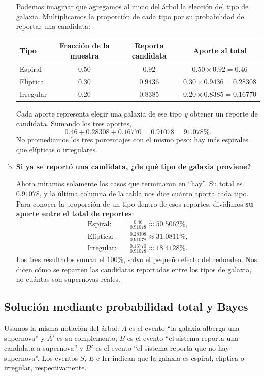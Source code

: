 \documentclass[a4paper]{article}
\begin{document}
\begin{enumerate}[a)]
Podemos imaginar que agregamos al inicio del árbol la elección del tipo de galaxia. Multiplicamos la proporción de cada tipo por su probabilidad de reportar una candidata:
\begin{center}
\begin{tabular}{lccc}
\toprule
Tipo & Fracción de la muestra & Reporta candidata & Aporte al total \\
\midrule
Espiral & $0.50$ & $0.92$ & $0.50\times0.92=0.46$ \\
Elíptica & $0.30$ & $0.9436$ & $0.30\times0.9436=0.28308$ \\
Irregular & $0.20$ & $0.8385$ & $0.20\times0.8385=0.16770$ \\
\bottomrule
\end{tabular}
\end{center}
Cada aporte representa elegir una galaxia de ese tipo \textit{y} obtener un reporte de candidata. Sumando los tres aportes,
$$
0.46+0.28308+0.16770=\boxed{0.91078=91.078\%}.
$$
No promediamos los tres porcentajes con el mismo peso: hay más espirales que elípticas o irregulares.

\item \textbf{Si ya se reportó una candidata, ¿de qué tipo de galaxia proviene?}

Ahora miramos solamente los casos que terminaron en ``hay''. Su total es $0.91078$, y la última columna de la tabla nos dice cuánto aporta cada tipo. Para conocer la proporción de un tipo dentro de esos reportes, dividimos \textbf{su aporte entre el total de reportes}:
\begin{align*}
\text{Espiral:}\quad
&\frac{0.46}{0.91078}\approx\boxed{50.5062\%},\\[2mm]
\text{Elíptica:}\quad
&\frac{0.28308}{0.91078}\approx\boxed{31.0811\%},\\[2mm]
\text{Irregular:}\quad
&\frac{0.16770}{0.91078}\approx\boxed{18.4128\%}.
\end{align*}
Los tres resultados suman el $100\%$, salvo el pequeño efecto del redondeo. Nos dicen cómo se reparten las candidatas reportadas entre los tipos de galaxia, no cuántas son supernovas reales.
\end{enumerate}

\subsection{Solución mediante probabilidad total y Bayes}

Usamos la misma notación del árbol: $A$ es el evento ``la galaxia alberga una supernova'' y $A'$ es su complemento; $B$ es el evento ``el sistema reporta una candidata a supernova'' y $B'$ es el evento ``el sistema reporta que no hay supernova''. Los eventos $S$, $E$ e $\mathrm{Irr}$ indican que la galaxia es espiral, elíptica o irregular, respectivamente.
\end{document}
